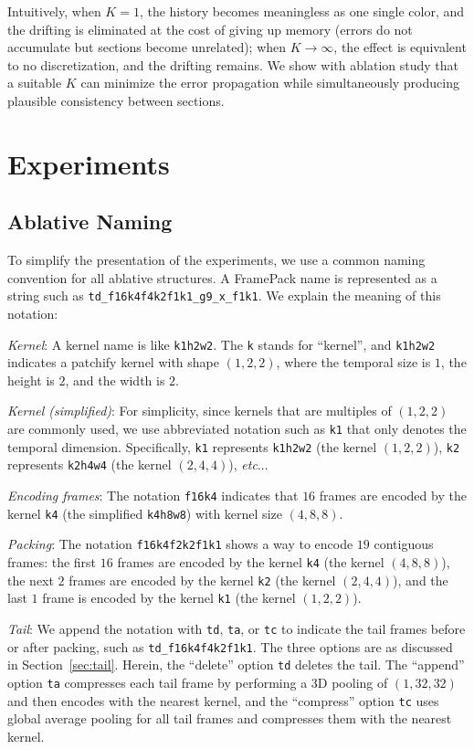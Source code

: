 \documentclass{article}
\makeatletter
\DeclareRobustCommand\onedot{\futurelet\@let@token\@onedot}
\def\@onedot{\ifx\@let@token.\else.\null\fi\xspace}
\def\etc{\emph{etc}\onedot}
\makeatother
\begin{document}
Intuitively, when $K=1$, the history becomes meaningless as one single color, and the drifting is eliminated at the cost of giving up memory (errors do not accumulate but sections become unrelated); when $K \to \infty$, the effect is equivalent to no discretization, and the drifting remains. We show with ablation study that a suitable $K$ can minimize the error propagation while simultaneously producing plausible consistency between sections.

\label{sec:history_disc}

\section{Experiments}

\subsection{Ablative Naming}

To simplify the presentation of the experiments, we use a common naming convention for all ablative structures. A FramePack name is represented as a string such as \texttt{td\_f16k4f4k2f1k1\_g9\_x\_f1k1}. We explain the meaning of this notation:

\emph{Kernel}: A kernel name is like \texttt{k1h2w2}. The \texttt{k} stands for ``kernel'', and \texttt{k1h2w2} indicates a patchify kernel with shape $(1,2,2)$, where the temporal size is $1$, the height is $2$, and the width is $2$.

\emph{Kernel (simplified)}: For simplicity, since kernels that are multiples of $(1,2,2)$ are commonly used, we use abbreviated notation such as \texttt{k1} that only denotes the temporal dimension. Specifically, \texttt{k1} represents \texttt{k1h2w2} (the kernel $(1,2,2)$), \texttt{k2} represents \texttt{k2h4w4} (the kernel $(2,4,4)$), \etc.

\emph{Encoding frames}: The notation \texttt{f16k4} indicates that $16$ frames are encoded by the kernel \texttt{k4} (the simplified \texttt{k4h8w8}) with kernel size $(4,8,8)$.

\emph{Packing}: The notation \texttt{f16k4f2k2f1k1} shows a way to encode $19$ contiguous frames: the first $16$ frames are encoded by the kernel \texttt{k4} (the kernel $(4,8,8)$), the next $2$ frames are encoded by the kernel \texttt{k2} (the kernel $(2,4,4)$), and the last $1$ frame is encoded by the kernel \texttt{k1} (the kernel $(1,2,2)$).

\emph{Tail}: We append the notation with \texttt{td}, \texttt{ta}, or \texttt{tc} to indicate the tail frames before or after packing, such as \texttt{td\_f16k4f4k2f1k1}. The three options are as discussed in Section~\ref{sec:tail}. Herein, the ``delete'' option \texttt{td} deletes the tail. The ``append'' option \texttt{ta} compresses each tail frame by performing a 3D pooling of $(1,32,32)$ and then encodes with the nearest kernel, and the ``compress'' option \texttt{tc} uses global average pooling for all tail frames and compresses them with the nearest kernel.
\end{document}
